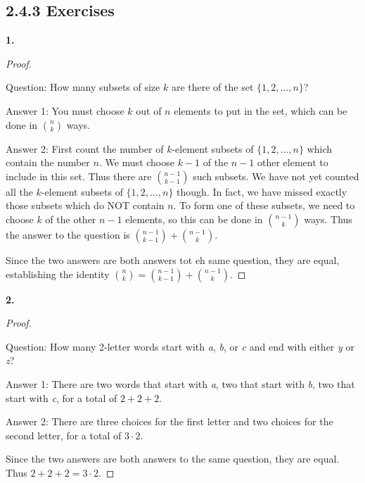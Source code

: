 \documentclass[10pt,]{book}
\theoremstyle{plain}
\theoremstyle{definition}
\theoremstyle{definition}
\theoremstyle{definition}
\numberwithin{equation}{section}
\begin{document}
\subsection*{2.4.3 Exercises}
\noindent\textbf{1.}\quad{}\begin{proof}\hypertarget{proof-7}{}

            Question: How many subsets of size \(k\) are there of the set \(\{1,2,\ldots, n\}\)?
\par

            Answer 1: You must choose \(k\) out of \(n\) elements to put in the set, which can be done in \({n \choose k}\) ways.
\par

            Answer 2: First count the number of \(k\)-element subsets of \(\{1,2,\ldots, n\}\) which contain the number \(n\). We must choose \(k-1\) of the \(n-1\) other element to include in this set. Thus there are \({n-1\choose k-1}\) such subsets. We have not yet counted all the \(k\)-element subsets of \(\{1,2,\ldots, n\}\) though. In fact, we have missed exactly those subsets which do NOT contain \(n\). To form one of these subsets, we need to choose \(k\) of the other \(n-1\) elements, so this can be done in \({n-1 \choose k}\) ways. Thus the answer to the question is \({n-1 \choose k-1} + {n-1 \choose k}\).
\par

             Since the two answers are both answers tot eh same question, they are equal, establishing the identity \({n\choose k} = {n-1 \choose k-1} + {n-1 \choose k}\).
\end{proof}
\par\smallskip
\noindent\textbf{2.}\quad{}\begin{proof}\hypertarget{proof-8}{}

            Question: How many 2-letter words start with \emph{a}, \emph{b}, or \emph{c} and end with either \emph{y} or \emph{z}?
\par

            Answer 1: There are two words that start with \emph{a}, two that start with \emph{b}, two that start with \emph{c}, for a total of \(2+2+2\).
\par

            Answer 2: There are three choices for the first letter and two choices for the second letter, for a total of \(3 \cdot 2\).
\par

            Since the two answers are both answers to the same question, they are equal. Thus \(2 + 2 + 2 = 3\cdot 2\).
\end{proof}
\end{document}
